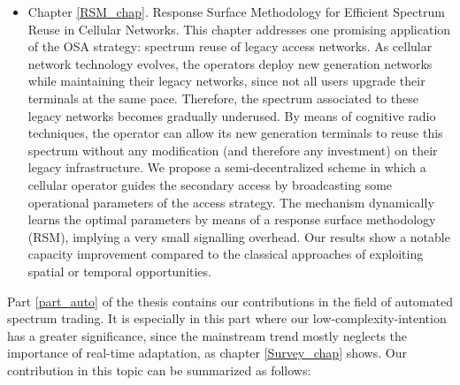\begin{itemize}
\item Chapter \ref{RSM_chap}. Response Surface Methodology for Efficient Spectrum Reuse in Cellular Networks.
This chapter addresses one promising application of the OSA strategy: spectrum reuse of legacy access networks. As cellular network technology evolves, the operators deploy new generation networks while maintaining their legacy networks, since not all users upgrade their terminals at the same pace.
Therefore, the spectrum associated to these legacy networks becomes gradually underused.
By means of cognitive radio techniques, the operator can allow its new generation terminals to reuse this spectrum without any modification (and therefore any investment) on their legacy infrastructure.
We propose a semi-decentralized scheme in which a cellular operator guides the secondary access by broadcasting some operational parameters of the access strategy.
The mechanism dynamically learns the optimal parameters by means of a response surface methodology (RSM), implying a very small signalling overhead.
Our results show a notable capacity improvement compared to the classical approaches of exploiting spatial or temporal opportunities.
\end{itemize}  
Part \ref{part_auto} of the thesis contains our contributions in the field of automated spectrum trading. 
It is especially in this part where our low-complexity-intention has a greater significance, since the mainstream trend mostly neglects the importance of real-time adaptation, as chapter \ref{Survey_chap} shows. 
Our contribution in this topic can be summarized as follows:
